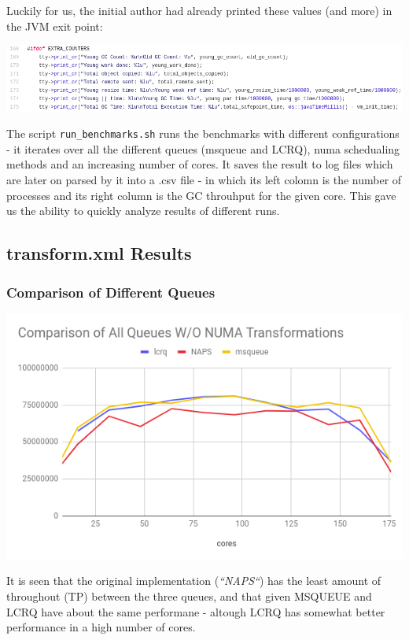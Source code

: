\documentclass{article}
\begin{document}
 Luckily for us, the initial author had already printed these values (and more) in the JVM exit point:

 \includegraphics[width=\textwidth]{gc-debug-prints.png}

 The script \texttt{run\_benchmarks.sh} runs the benchmarks with different configurations - it iterates over all the different queues (msqueue and LCRQ), numa schedualing methods and an increasing number of cores. It saves the result to log files which are later on parsed by it into a .csv file - in which its left colomn is the number of processes and its right column is the GC throuhput for the given core.
This gave us the ability to quickly analyze results of different runs.

 \newpage

 \subsection{transform.xml Results}
 \subsubsection{Comparison of Different Queues}

 \includegraphics[width=\textwidth]{graph-no-schedule.png}

 It is seen that the original implementation (\textit{``NAPS``}) has the least amount of throughout (TP) between the three queues, and that given MSQUEUE and LCRQ have about the same performane - altough LCRQ has somewhat better performance in a high number of cores.
\end{document}
